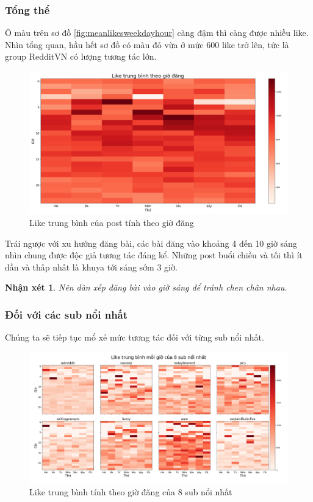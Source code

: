 \documentclass[10pt,a4paper]{article}
\newtheorem{remark}{Nhận xét}
\begin{document}
\subsubsection{Tổng thể}
Ô màu trên sơ đồ \eqref{fig:meanlikesweekdayhour} càng đậm thì càng được nhiều like. Nhìn tổng quan, hầu hết sơ đồ có màu đỏ vừa ở mức 600 like trở lên, tức là group RedditVN có lượng tương tác lớn.
\begin{figure}[!ht]
    \centering
    \includegraphics[width=\textwidth]{img/MeanLikesWeekdayHour.png}
    \caption{Like trung bình của post tính theo giờ đăng}
    \label{fig:meanlikesweekdayhour}
\end{figure}

Trái ngược với xu hướng đăng bài, các bài đăng vào khoảng 4 đến 10 giờ sáng nhìn chung được độc giả tương tác đáng kể. Những post buổi chiều và tối thì ít dần và thấp nhất là khuya tới sáng sớm 3 giờ.

\begin{remark}
    \label{re:time}
    Nên dàn xếp đăng bài vào giờ sáng để tránh chen chân nhau.
\end{remark}
\subsubsection{Đối với các sub nổi nhất}
Chúng ta sẽ tiếp tục mổ xẻ mức tương tác đối với từng sub nổi nhất.
\begin{figure}[!h]
    \centering
    \includegraphics[width=\textwidth]{img/MeanLikesWeekdayHourPerSub.png}
    \caption{Like trung bình tính theo giờ đăng của 8 sub nổi nhất}
    \label{fig:meanlikesweekdayhourpersub}
\end{figure}
\end{document}
